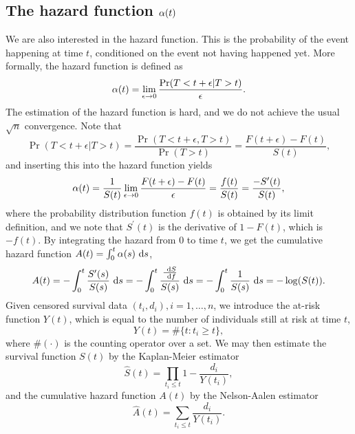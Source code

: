 \subsection{The hazard function $\alpha(t)$}
We are also interested in the hazard function. This is the probability of the event happening at time $t$, conditioned on the event not having happened yet. More formally, the hazard function is defined as
\begin{equation*}
    \alpha(t)=\lim_{\epsilon\to0}\frac{\Pr(T<t+\epsilon|T>t)}{\epsilon}.
\end{equation*}
The estimation of the hazard function is hard, and we do not achieve the usual $\sqrt{n}$ convergence. 
Note that
\begin{equation*}
    \Pr(T<t+\epsilon|T>t)=\frac{\Pr(T<t+\epsilon,T>t)}{\Pr(T>t)}=\frac{F(t+\epsilon)-F(t)}{S(t)},
\end{equation*}
and inserting this into the hazard function yields
\begin{equation}
\label{eq:hfs}
    \alpha(t)=\frac{1}{S(t)}\lim_{\epsilon\to0}\frac{F(t+\epsilon)-F(t)}{\epsilon}=\frac{f(t)}{S(t)}=\frac{-S^\prime(t)}{S(t)},
\end{equation}
where the probability distribution function $f(t)$ is obtained by its limit definition, and we note that $S^\prime(t)$ is the derivative of $1-F(t)$, which is $-f(t)$. By integrating the hazard from 0 to time $t$, we get the cumulative hazard function $A(t)=\int_0^t\alpha(s)~\text{d} s$,
\begin{equation}\label{eq:cumulative-hazard}
    A(t)=-\int_0^t\frac{S^\prime(s)}{S(s)}~\text{d} s=-\int_0^t\frac{\frac{~\text{d} S}{~\text{d} f}}{S(s)}~\text{d} s=-\int_0^t\frac{1}{S(s)}~\text{d} s=-\log(S(t)).
\end{equation}
Given censored survival data $(t_i,d_i),i=1,\ldots,n$, we introduce the at-risk function $Y(t)$, which is equal to the number of individuals still at risk at time $t$,
\begin{equation*}
    Y(t)=\#\{t\colon t_i\geq t\},
\end{equation*}
where $\#(\cdot)$ is the counting operator over a set. We may then estimate the survival function $S(t)$ by the Kaplan-Meier estimator 
\begin{equation*}
    \hat{S}(t)=\prod_{t_i\leq t}1-\frac{d_i}{Y(t_i)},
\end{equation*}
and the cumulative hazard function $A(t)$ by the Nelson-Aalen estimator 
\begin{equation*}
    \hat{A}(t)=\sum_{t_i\leq t}\frac{d_i}{Y(t_i)}.
\end{equation*}

